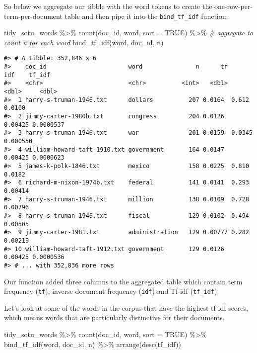 \documentclass[
]{book}
\newenvironment{Shaded}{\begin{snugshade}}{\end{snugshade}}
\newcommand{\AttributeTok}[1]{\textcolor[rgb]{0.77,0.63,0.00}{#1}}
\newcommand{\CommentTok}[1]{\textcolor[rgb]{0.56,0.35,0.01}{\textit{#1}}}
\newcommand{\ConstantTok}[1]{\textcolor[rgb]{0.00,0.00,0.00}{#1}}
\newcommand{\FunctionTok}[1]{\textcolor[rgb]{0.00,0.00,0.00}{#1}}
\newcommand{\NormalTok}[1]{#1}
\newcommand{\SpecialCharTok}[1]{\textcolor[rgb]{0.00,0.00,0.00}{#1}}
\begin{document}
So below we aggregate our tibble with the word tokens to create the one-row-per-term-per-document table and then pipe it into the \texttt{bind\_tf\_idf} function.

\begin{Shaded}
\begin{Highlighting}[]
\NormalTok{tidy\_sotu\_words }\SpecialCharTok{\%\textgreater{}\%}
  \FunctionTok{count}\NormalTok{(doc\_id, word, }\AttributeTok{sort =} \ConstantTok{TRUE}\NormalTok{)  }\SpecialCharTok{\%\textgreater{}\%}  \CommentTok{\# aggregate to count n for each word}
  \FunctionTok{bind\_tf\_idf}\NormalTok{(word, doc\_id, n) }
\end{Highlighting}
\end{Shaded}

\begin{verbatim}
#> # A tibble: 352,846 x 6
#>    doc_id                       word               n      tf     idf    tf_idf
#>    <chr>                        <chr>          <int>   <dbl>   <dbl>     <dbl>
#>  1 harry-s-truman-1946.txt      dollars          207 0.0164  0.612   0.0100   
#>  2 jimmy-carter-1980b.txt       congress         204 0.0126  0.00425 0.0000537
#>  3 harry-s-truman-1946.txt      war              201 0.0159  0.0345  0.000550 
#>  4 william-howard-taft-1910.txt government       164 0.0147  0.00425 0.0000623
#>  5 james-k-polk-1846.txt        mexico           158 0.0225  0.810   0.0182   
#>  6 richard-m-nixon-1974b.txt    federal          141 0.0141  0.293   0.00414  
#>  7 harry-s-truman-1946.txt      million          138 0.0109  0.728   0.00796  
#>  8 harry-s-truman-1946.txt      fiscal           129 0.0102  0.494   0.00505  
#>  9 jimmy-carter-1981.txt        administration   129 0.00777 0.282   0.00219  
#> 10 william-howard-taft-1912.txt government       129 0.0126  0.00425 0.0000536
#> # ... with 352,836 more rows
\end{verbatim}

Our function added three columns to the aggregated table which contain term frequency (\texttt{tf}), inverse document frequency (\texttt{idf}) and Tf-idf (\texttt{tf\_idf}).

Let's look at some of the words in the corpus that have the highest tf-idf scores, which means words that are particularly distinctive for their documents.

\begin{Shaded}
\begin{Highlighting}[]
\NormalTok{tidy\_sotu\_words }\SpecialCharTok{\%\textgreater{}\%}
  \FunctionTok{count}\NormalTok{(doc\_id, word, }\AttributeTok{sort =} \ConstantTok{TRUE}\NormalTok{)  }\SpecialCharTok{\%\textgreater{}\%} 
  \FunctionTok{bind\_tf\_idf}\NormalTok{(word, doc\_id, n) }\SpecialCharTok{\%\textgreater{}\%} 
  \FunctionTok{arrange}\NormalTok{(}\FunctionTok{desc}\NormalTok{(tf\_idf))}
\end{Highlighting}
\end{Shaded}
\end{document}
